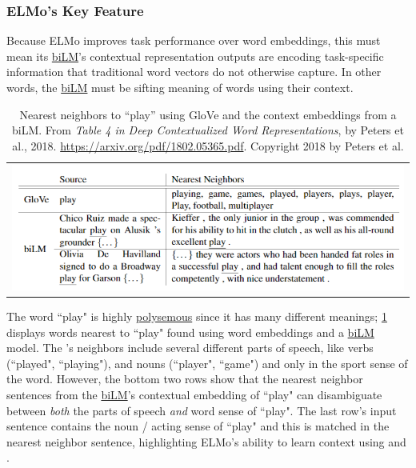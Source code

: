 \subsubsection{ELMo's Key Feature} \label{sec:ELMoKeyFeature}

Because ELMo improves task performance over word embeddings, this must mean its \hyperref[sec:BidirectionalLM]{biLM}'s contextual representation outputs are encoding task-specific information that traditional word vectors do not otherwise capture. In other words, the \hyperref[sec:BidirectionalLM]{biLM} must be sifting meaning of words using their context.   


\begin{table}[ht!]
  \centering
  \begin{tabular}{ c }
    
    \begin{minipage}{.8\textwidth}
      \includegraphics[width=\linewidth]{imgs/table_elmoPlay.png}
    \end{minipage}
    
  \end{tabular}
  \caption{\footnotesize Nearest neighbors to ``play” using GloVe and the context embeddings from a biLM. From \emph{Table 4 in Deep Contextualized Word Representations}, by Peters et al., 2018. \url{https://arxiv.org/pdf/1802.05365.pdf}. Copyright 2018 by Peters et al.}
  \label{tbl:elmoPlayExample}
\end{table}


The word ``play" is highly \hyperref[sec:PolysemyAgainInElmo]{polysemous} since it has many different meanings;  \cref{tbl:elmoPlayExample} displays words nearest to ``play" found using  word embeddings and a \hyperref[sec:BidirectionalLM]{biLM} model. The 's neighbors include several different parts of speech, like verbs (``played", ``playing"), and nouns (``player", ``game") and only in the sport sense of the word. However, the bottom two rows show that the nearest neighbor sentences from the \hyperref[sec:BidirectionalLM]{biLM}'s contextual embedding of ``play" can disambiguate between \emph{both} the parts of speech \emph{and} word sense of ``play". The last row's input sentence contains the noun / acting sense of ``play" and this is matched in the nearest neighbor sentence, highlighting ELMo's ability to learn context using  and . 